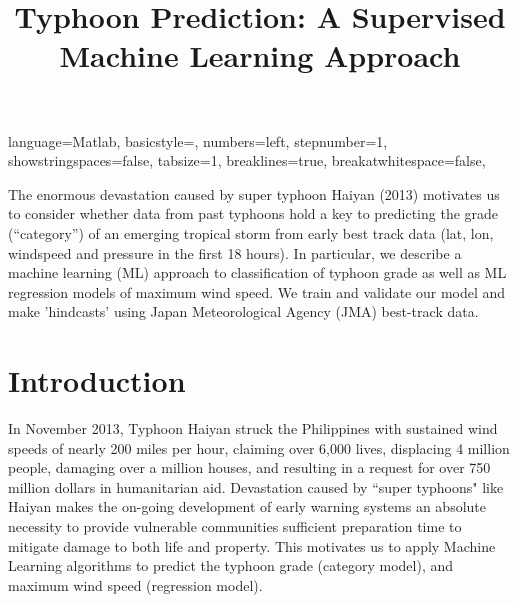 \documentclass{SBCbookchapter}
\title{Typhoon Prediction: A Supervised Machine Learning Approach}
\begin{document}
\maketitle
\lstset
{ %
    language=Matlab,
    basicstyle=\footnotesize,
    numbers=left,
    stepnumber=1,
    showstringspaces=false,
    tabsize=1,
    breaklines=true,
    breakatwhitespace=false,
}




\vspace{.3in}
\begin{minipage}[r]{4.25in}{\small
  The enormous devastation caused by super typhoon Haiyan (2013) motivates us to consider whether data from past typhoons hold a key to predicting the grade (``category'') of an emerging tropical storm from early best track data (lat, lon, windspeed and pressure in the first 18 hours). In particular, we describe a machine learning (ML) approach to classification of typhoon grade as well as ML regression models of maximum wind speed. We train and validate our model and make 'hindcasts' using Japan Meteorological Agency (JMA) best-track data.}
\end{minipage}

\newpage

\section{Introduction}

  In November 2013, Typhoon Haiyan struck the Philippines with sustained wind speeds of nearly 200
miles per hour, claiming over 6,000 lives, displacing 4 million people, damaging over a million houses,
and resulting in a request for over 750 million dollars
in humanitarian aid. Devastation caused by
``super typhoons" like Haiyan makes the on-going
development of early warning systems an absolute
necessity to provide vulnerable communities sufficient preparation time to
mitigate damage to both life and property. This motivates us to apply Machine Learning algorithms to predict the typhoon grade (category model), and maximum wind speed (regression model).
\end{document}
